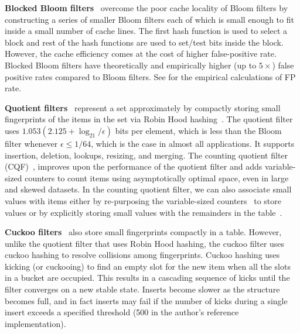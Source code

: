\textbf{Blocked Bloom filters}~\cite{putze2007cache} overcome the poor cache
locality of Bloom filters by constructing a series of smaller Bloom filters each
of which is small enough to fit inside a small number of cache lines. The first
hash function is used to select a block and rest of the hash functions are used
to set/test bits inside the block. However, the cache efficiency comes at the
cost of higher false-positive rate. Blocked Bloom filters have theoretically and
empirically higher (up to $5\times$) false positive rates compared to Bloom
filters. See  for the empirical calculations of FP
rate.

\textbf{Quotient
filters}~\cite{Cleary84,PaghPaRa05,DillingerMa09,BenderFaJo12a,PandeyBJP17,pandeySigmod21}
represent a set approximately by compactly storing small fingerprints of the
items in the set via Robin Hood hashing~\cite{CelisLaMu85}. The quotient filter
uses $1.053 (2.125 + \log_21/\epsilon)$ bits per element, which is less than the
Bloom filter whenever $\epsilon \leq 1/64$, which is the case in almost all
applications. It supports insertion, deletion, lookups, resizing, and merging.
The counting quotient filter (CQF)~\cite{PandeyBJP17}, improves upon the
performance of the quotient filter and adds variable-sized counters to count
items using asymptotically optimal space, even in large and skewed datasets. In
the counting quotient filter, we can also associate small values with items
either by re-purposing the variable-sized counters~\cite{PandeyABFJP18Cell} to
store values or by explicitly storing small values with the remainders in the
table~\cite{PandeySMB20}.

\textbf{Cuckoo filters}~\cite{FanAnKa14,BreslowJ18} also store small
fingerprints compactly in a table. However, unlike the quotient filter that uses
Robin Hood hashing, the cuckoo filter uses cuckoo hashing to resolve collisions
among fingerprints. Cuckoo hashing uses kicking (or cuckooing) to find an empty
slot for the new item when all the slots in a bucket are occupied. This results
in a cascading sequence of kicks until the filter converges on a new stable
state. Inserts become slower as the structure becomes full, and in fact inserts
may fail if the number of kicks during a single insert exceeds a specified
threshold (500 in the author's reference implementation).

